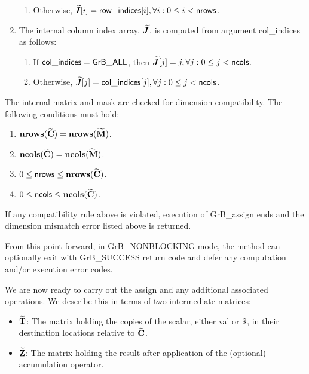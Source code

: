 \begin{enumerate}
\begin{enumerate}
		\item	Otherwise, $\bm{\widetilde{I}}[i] = {\sf row\_indices}[i], 
        \forall i : 0 \leq i < {\sf nrows}$.
    \end{enumerate}
    
    \item The internal column index array, $\bm{\widetilde{J}}$, is computed from 
    argument {\sf col\_indices} as follows:
	\begin{enumerate}
		\item	If ${\sf col\_indices} = {\sf GrB\_ALL}$, then 
        $\bm{\widetilde{J}}[j] = j, \forall j : 0 \leq j < {\sf ncols}$.

		\item	Otherwise, $\bm{\widetilde{J}}[j] = {\sf col\_indices}[j], 
        \forall j : 0 \leq j < {\sf ncols}$.
    \end{enumerate}
\end{enumerate}

The internal matrix and mask are checked for dimension compatibility. The following
conditions must hold:
\begin{enumerate}
    \item $\bold{nrows}({\bf \widetilde{C}}) = \bold{nrows}({\bf \widetilde{M}})$.

    \item $\bold{ncols}({\bf \widetilde{C}}) = \bold{ncols}({\bf \widetilde{M}})$.

    \item $0 \leq {\sf nrows} \leq \bold{nrows}({\bf \widetilde{C}})$.

    \item $0 \leq {\sf ncols} \leq \bold{ncols}({\bf \widetilde{C}})$.
\end{enumerate}
If any compatibility rule above is violated, execution of {\sf GrB\_assign} ends and 
the dimension mismatch error listed above is returned.

From this point forward, in {\sf GrB\_NONBLOCKING} mode, the method can 
optionally exit with {\sf GrB\_SUCCESS} return code and defer any computation 
and/or execution error codes.

We are now ready to carry out the assign and any additional 
associated operations.  We describe this in terms of two intermediate matrices:
\begin{itemize}
    \item ${\bf \widetilde{T}}$: The matrix holding the copies of the scalar, either 
	{\sf val} or ${\tilde{s}}$, in their destination locations relative to 
    ${\bf \widetilde{C}}$.

    \item ${\bf \widetilde{Z}}$: The matrix holding the result after 
    application of the (optional) accumulation operator.
\end{itemize}

